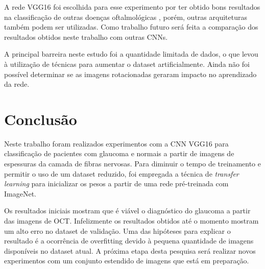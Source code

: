 \documentclass[conference]{IEEEtran}
\begin{document}

A rede VGG16 foi escolhida para esse experimento por ter obtido bons resultados na classificação de outras doenças oftalmológicas \cite{li2017, lee2017}, porém, outras arquiteturas também podem ser utilizadas. Como trabalho futuro será feita a comparação dos resultados obtidos neste trabalho com outras CNNs.

A principal barreira neste estudo foi a quantidade limitada de dados, o que levou à utilização de técnicas para aumentar o dataset artificialmente. Ainda não foi possível determinar se as imagens rotacionadas geraram impacto no aprendizado da rede. 


\section{Conclusão}

Neste trabalho foram realizados experimentos com a CNN VGG16 para classificação de pacientes com glaucoma e normais a partir de imagens de espessuras da camada de fibras nervosas. Para diminuir o tempo de treinamento e permitir o uso de um dataset reduzido, foi empregada a técnica de \textit{transfer learning} para inicializar os pesos a partir de uma rede pré-treinada com ImageNet.

Os resultados iniciais mostram que é viável o diagnóstico do glaucoma a partir das imagens de OCT. Infelizmente os resultados obtidos até o momento mostram um alto erro no dataset de validação. Uma das hipóteses para explicar o resultado é a ocorrência de overfitting devido à pequena quantidade de imagens disponíveis no dataset atual. A próxima etapa desta pesquisa será realizar novos experimentos com um conjunto estendido de imagens que está em preparação.




\end{document}
